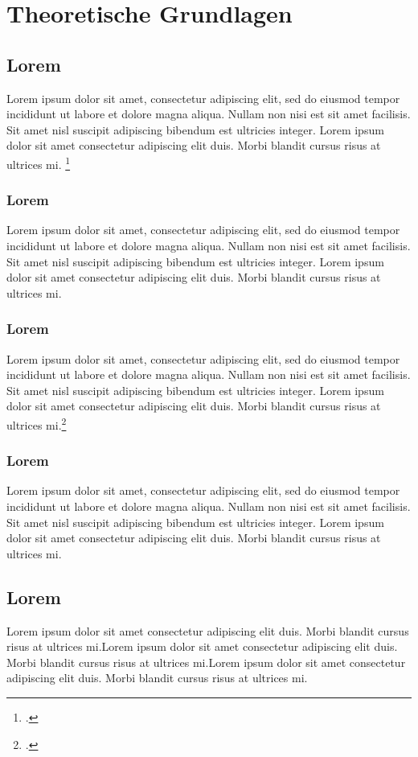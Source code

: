 \section{Theoretische Grundlagen}\label{theoretische_grundlagen}\thispagestyle{FooBar}
\subsection{Lorem}
Lorem ipsum dolor sit amet, consectetur adipiscing elit, sed do eiusmod tempor incididunt ut labore et dolore magna aliqua. Nullam non nisi est sit amet facilisis. Sit amet nisl suscipit adipiscing bibendum est ultricies integer. Lorem ipsum dolor sit amet consectetur adipiscing elit duis. Morbi blandit cursus risus at ultrices mi.  \footcite[10]{itzhaki}
\subsubsection{Lorem}
Lorem ipsum dolor sit amet, consectetur adipiscing elit, sed do eiusmod tempor incididunt ut labore et dolore magna aliqua. Nullam non nisi est sit amet facilisis. Sit amet nisl suscipit adipiscing bibendum est ultricies integer. Lorem ipsum dolor sit amet consectetur adipiscing elit duis. Morbi blandit cursus risus at ultrices mi. \textcite[10]{almendro}
\subsubsection{Lorem}
Lorem ipsum dolor sit amet, consectetur adipiscing elit, sed do eiusmod tempor incididunt ut labore et dolore magna aliqua. Nullam non nisi est sit amet facilisis. Sit amet nisl suscipit adipiscing bibendum est ultricies integer. Lorem ipsum dolor sit amet consectetur adipiscing elit duis. Morbi blandit cursus risus at ultrices mi.\footcite[10]{sorace}
\subsubsection{Lorem}
Lorem ipsum dolor sit amet, consectetur adipiscing elit, sed do eiusmod tempor incididunt ut labore et dolore magna aliqua. Nullam non nisi est sit amet facilisis. Sit amet nisl suscipit adipiscing bibendum est ultricies integer. Lorem ipsum dolor sit amet consectetur adipiscing elit duis. Morbi blandit cursus risus at ultrices mi. 
\newpage
\subsection{Lorem}
Lorem ipsum dolor sit amet consectetur adipiscing elit duis. Morbi blandit cursus risus at ultrices mi.Lorem ipsum dolor sit amet consectetur adipiscing elit duis. Morbi blandit cursus risus at ultrices mi.Lorem ipsum dolor sit amet consectetur adipiscing elit duis. Morbi blandit cursus risus at ultrices mi.
